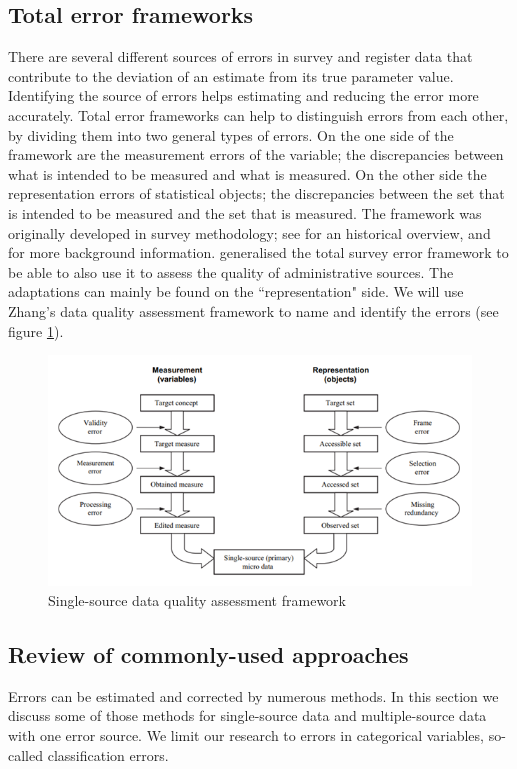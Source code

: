 \documentclass[a4paper, 11pt]{article} %
\begin{document}
\subsection{Total error frameworks}
There are several different sources of errors in survey and register data that contribute to the deviation of an estimate from its true parameter value. Identifying the source of errors helps estimating and reducing the error more accurately. Total error frameworks can help to distinguish errors from each other, by dividing them into two general types of errors. On the one side of the framework are the measurement errors of the variable; the discrepancies between what is intended to be measured and what is measured. On the other side the representation errors of statistical objects; the discrepancies between the set that is intended to be measured and the set that is measured. The framework was originally developed in survey methodology; see  for an historical overview, and  for more background information.  generalised the total survey error framework to be able to also use it to assess the quality of administrative sources. The adaptations can mainly be found on the ``representation" side. We will use Zhang's data quality assessment framework to name and identify the errors (see figure \ref{fig:zhang}).

\begin{figure}[h]
    \centering
    \includegraphics[scale=0.9]{ZHANG2012.png}
    \caption{Single-source data quality assessment framework \cite{ZhangTSE2012}}
    \label{fig:zhang}
\end{figure}

\subsection{Review of commonly-used approaches}
 Errors can be estimated and corrected by numerous methods. In this section we discuss some of those methods for single-source data and multiple-source data with one error source. We limit our research to errors in categorical variables, so-called classification errors. 
\end{document}
